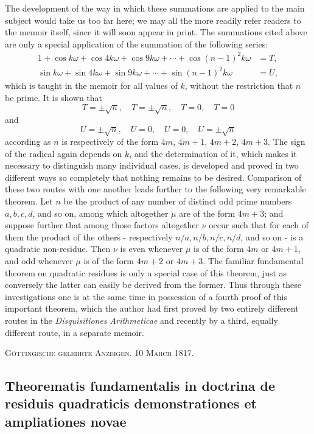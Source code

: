 \documentclass[12pt]{article}
\begin{document}
The development of the way in which these summations are applied to the main subject would take us too far here; we may all the more readily refer readers to the memoir itself, since it will soon appear in print. The summations cited above are only a special application of the summation of the following series:
\begin{align*}
1+\cos k\omega+\cos4k\omega+\cos9k\omega+\cdots+\cos(n-1)^2k\omega&=T,\\
\sin k\omega+\sin4k\omega+\sin9k\omega+\cdots+\sin(n-1)^2k\omega&=U,
\end{align*}
which is taught in the memoir for all values of $k$, without the restriction that $n$ be prime. It is shown that
\[
T=\pm\sqrt n,
\quad T=\pm\sqrt n,
\quad T=0,
\quad T=0
\]
and
\[
U=\pm\sqrt n,
\quad U=0,
\quad U=0,
\quad U=\pm\sqrt n
\]
according as $n$ is respectively of the form $4m$, $4m+1$, $4m+2$, $4m+3$. The sign of the radical again depends on $k$, and the determination of it, which makes it necessary to distinguish many individual cases, is developed and proved in two different ways so completely that nothing remains to be desired. Comparison of these two routes with one another leads further to the following very remarkable theorem. Let $n$ be the product of any number of distinct odd prime numbers $a,b,c,d$, and so on, among which altogether $\mu$ are of the form $4m+3$; and suppose further that among those factors altogether $\nu$ occur such that for each of them the product of the others - respectively $n/a,n/b,n/c,n/d$, and so on - is a quadratic non-residue. Then $\nu$ is even whenever $\mu$ is of the form $4m$ or $4m+1$, and odd whenever $\mu$ is of the form $4m+2$ or $4m+3$. The familiar fundamental theorem on quadratic residues is only a special case of this theorem, just as conversely the latter can easily be derived from the former. Thus through these investigations one is at the same time in possession of a fourth proof of this important theorem, which the author had first proved by two entirely different routes in the \textit{Disquisitiones Arithmeticae} and recently by a third, equally different route, in a separate memoir.

\begin{center}
\textsc{Göttingische gelehrte Anzeigen. 10 March 1817.}
\end{center}

\subsection*{Theorematis fundamentalis in doctrina de residuis quadraticis demonstrationes et ampliationes novae}
\end{document}
